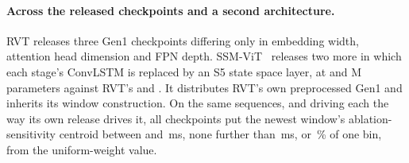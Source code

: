 \documentclass[10pt,twocolumn,letterpaper]{article}
\begin{document}
\paragraph{Across the released checkpoints and a second architecture.}
RVT releases three Gen1 checkpoints differing only in embedding width, attention
head dimension and FPN depth. SSM-ViT~\cite{zubic2024ssm} releases two more in
which each stage's ConvLSTM is replaced by an S5 state space layer, at \ssmParamsS{}
and \ssmParamsB{} M parameters against RVT's \capParamsS{} and \capParamsB{}.
It distributes RVT's own preprocessed Gen1 and inherits its window construction. On the same sequences, and
driving each the way its own release drives it, all \archCkpts{} checkpoints put the
newest window's ablation-sensitivity centroid between \archHi{} and \archLo\,ms, none further than
\archUnifMax\,ms, or \archUnifPct\,\% of one bin, from the uniform-weight value.
\end{document}
